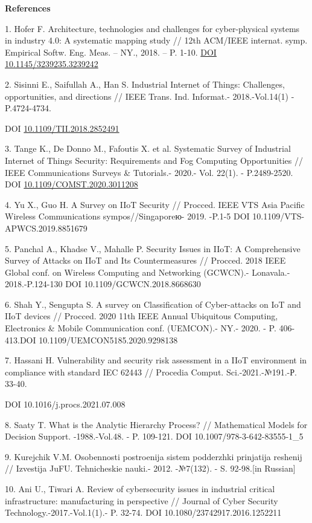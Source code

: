 {\bfseries References}

1. Hofer F. Architecture, technologies and challenges for cyber-physical
systems in industry 4.0: A systematic mapping study // 12th ACM/IEEE
internat. symp. Empirical Softw. Eng. Meas. -- NY., 2018. -- P. 1-10.
\href{https://doi.org/10.1145/3239235.3239242}{DOI
10.1145/3239235.3239242}

2. Sisinni E., Saifullah A., Han S. Industrial Internet of Things:
Challenges, opportunities, and directions // IEEE Trans. Ind. Informat.-
2018.-Vol.14(1) - P.4724-4734.

DOI
\href{https://doi.org/10.1109/TII.2018.2852491}{10.1109/TII.2018.2852491}

3. Tange K., De Donno M., Fafoutis X. et al. Systematic Survey of
Industrial Internet of Things Security: Requirements and Fog Computing
Opportunities // IEEE Communications Surveys \& Tutorials.- 2020.- Vol.
22(1). - P.2489-2520. DOI
\href{http://dx.doi.org/10.1109/COMST.2020.3011208}{10.1109/COMST.2020.3011208}

4. Yu X., Guo H. A Survey on IIoT Security // Procced. IEEE VTS Asia
Pacific Wireless Communications sympos//Singaporeю- 2019. -P.1-5 DOI
10.1109/VTS-APWCS.2019.8851679

5. Panchal A., Khadse V., Mahalle P. Security Issues in IIoT: A
Comprehensive Survey of Attacks on IIoT and Its Countermeasures //
Procced. 2018 IEEE Global conf. on Wireless Computing and Networking
(GCWCN).- Lonavala.- 2018.-P.124-130 DOI 10.1109/GCWCN.2018.8668630

6. Shah Y., Sengupta S. A survey on Classification of Cyber-attacks on
IoT and IIoT devices // Procced. 2020 11th IEEE Annual Ubiquitous
Computing, Electronics \& Mobile Communication conf. (UEMCON).- NY.-
2020. - P. 406-413.DOI 10.1109/UEMCON5185.2020.9298138

7. Hassani H. Vulnerability and security risk assessment in a IIoT
environment in compliance with standard IEC 62443 // Procedia Comput.
Sci.-2021.-№191.-Р. 33-40.

DOI 10.1016/j.procs.2021.07.008

8. Saaty T. What is the Analytic Hierarchy Process? // Mathematical
Models for Decision Support. -1988.-Vol.48. - P. 109-121. DOI
10.1007/978-3-642-83555-1\_5

9. Kurejchik V.M. Osobennosti postroenija sistem podderzhki prinjatija
reshenij // Izvestija JuFU. Tehnicheskie nauki.- 2012. -№7(132). - S.
92-98.{[}in Russian{]}

10. Ani U., Tiwari A. Review of cybersecurity issues in industrial
critical infrastructure: manufacturing in perspective // Journal of
Cyber Security Technology.-2017.-Vol.1(1).- P. 32-74. DOI
10.1080/23742917.2016.1252211

